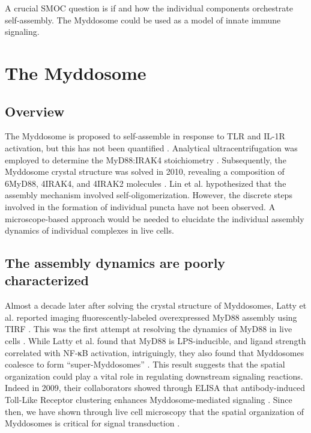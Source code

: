 A crucial SMOC question is if and how the individual components orchestrate self-assembly. The Myddosome could be used as a model of innate immune signaling.
 
\section{The Myddosome}
\subsection{Overview}
\label{section:intro_Myddosome}
The Myddosome is proposed to self-assemble in response to TLR and IL-1R activation, but this has not been quantified \autocite{Kagan_2014}\autocite{Lin_2010}\autocite{Latty_2018}. Analytical ultracentrifugation was employed to determine the MyD88:IRAK4 stoichiometry \autocite{Motshwene_2009}. Subsequently, the Myddosome crystal structure was solved in 2010, revealing a composition of 6\times MyD88, 4\times IRAK4, and 4\times IRAK2 molecules \autocite{Lin_2010}. Lin et al. hypothesized that the assembly mechanism involved self-oligomerization. However, the discrete steps involved in the formation of individual puncta have not been observed. A microscope-based approach would be needed to elucidate the individual assembly dynamics of individual complexes in live cells.
 
\subsection{The assembly dynamics are poorly characterized}
\label{subsection:assembly}
Almost a decade later after solving the crystal structure of Myddosomes, Latty et al. reported imaging fluorescently-labeled overexpressed MyD88 assembly using TIRF \autocite{Latty_2018}. This was the first attempt at resolving the dynamics of MyD88 in live cells \autocite{Latty_2018}. While Latty et al. found that MyD88 is LPS-inducible, and ligand strength correlated with NF-κB activation, intriguingly, they also found that Myddosomes coalesce to form “super-Myddosomes” \autocite{Latty_2018}. This result suggests that the spatial organization could play a vital role in regulating downstream signaling reactions. Indeed in 2009, their collaborators showed through ELISA that antibody-induced Toll-Like Receptor clustering enhances Myddosome-mediated signaling \autocite{Motshwene_2009}. Since then, we have shown through live cell microscopy that the spatial organization of Myddosomes is critical for signal transduction \autocite{Cao_2023}.
 
